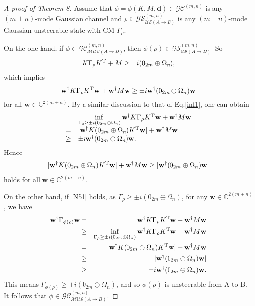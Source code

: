 \documentclass[10pt,aps,pra,amsfonts,amssymb,amsmath,%
floatfix,nofootinbib, groupedaddress,superscriptaddress,citesort,twocolumn
]{revtex4}%
\begin{document}
	\begin{proof}[A proof of Theorem 8]
		Assume that  $\phi =\phi\left( {K,M,\mathbf d} \right) \in {\mathcal {GC}}^{\left(m,n \right)}$ is any $(m+n)$-mode Gaussian channel and $\rho\in {\mathcal {GS}}^{(m,n)}_{\mathcal {US}(A \rightarrow B)}$ is any $(m+n)$-mode Gaussian unsteerable state with CM $\Gamma_{\rho}$.
		
		On the one hand, if  $\phi \in  {\mathcal {GC}}^{(m,n)}_{\mathcal {MUS}(A \rightarrow B)}$, 
		then 
		$\phi(\rho)\in {\mathcal {GS}}^{(m,n)}_{\mathcal {US}(A \rightarrow B)}$. So
		\begin{eqnarray*}
			K\Gamma_{\rho}K^{\rm T}+M  \ge \pm i( 0_{2m} \oplus \Omega _n ),
		\end{eqnarray*}
		which implies  
		\begin{eqnarray*}\label{N53}
			\mathbf{w}^{\dag}K\Gamma_{\rho}K^{\rm T}\mathbf{w}+\mathbf{w}^{\dag}M\mathbf{w}  \ge \pm i \mathbf{w}^{\dag} (0_{2m} \oplus \Omega _n)\mathbf{w}
		\end{eqnarray*}
		for all	$\mathbf{w} \in \mathbb{C}^{2(m+n)}$.
		By a similar discussion to that of Eq.\eqref{inf1},  one can obtain
		$$\begin{array}{rl}
			&\inf\limits_{\Gamma_{\rho} \ge  \pm i( 0_{2m} \oplus \Omega _n)}	\mathbf{w}^{\dag}K\Gamma_{\rho}K^{\rm T}\mathbf{w}+\mathbf{w}^{\dag}M\mathbf{w}  \\
			=& |{\bf w}^\dag K(0_{2m} \oplus \Omega _n)K^{\rm T}{\bf w}|+\mathbf{w}^{\dag}M\mathbf{w}  \\
			\ge &\pm i\mathbf{w}^{\dag} (0_{2m} \oplus \Omega _n)\mathbf{w}.
		\end{array}$$
		Hence
		\begin{eqnarray*}
			|\mathbf{w}^{\dag}K(0_{2m} \oplus \Omega _n)K^{\rm T}\mathbf{w}|+\mathbf{w}^{\dag}M\mathbf{w} \ge |\mathbf{w}^{\dag} (0_{2m} \oplus \Omega _n)\mathbf{w}|
		\end{eqnarray*}
		holds for all 	 $\mathbf{w} \in \mathbb{C}^{2(m+n)}$.
		
		On the other hand,  if \eqref{N51} holds, as $\Gamma_{\rho} \ge  \pm i\left( { 0_{2m} \oplus {\Omega _n}} \right) $,    for any $ \mathbf{w} \in \mathbb{C}^{2(m+n)}$, 
		we have
		\begin{eqnarray*}
			\mathbf{w}^{\dag}\Gamma _{\phi ( \rho )}\mathbf{w}
			&=&\mathbf{w}^{\dag}K\Gamma_{\rho} {K^{\rm T}}\mathbf{w} +\mathbf{w}^{\dag} M \mathbf{w}\\
			&\ge& \inf_{\Gamma_{\rho} \ge \pm i( 0_{2m} \oplus \Omega _n )} \mathbf{w}^{\dag}K\Gamma_{\rho} {K^{\rm T}}\mathbf{w} +\mathbf{w}^{\dag} M \mathbf{w}\\
			&=& |\mathbf{w}^{\dag}K(0_{2m} \oplus \Omega _n)K^{\rm T}\mathbf{w}|+\mathbf{w}^{\dag}M\mathbf{w}  \\
			&\ge& |\mathbf{w}^{\dag} (0_{2m} \oplus \Omega _n)\mathbf{w}|\\
			&\ge& \pm i\mathbf{w}^{\dag } (0_{2m} \oplus \Omega _n)\mathbf{w} .
		\end{eqnarray*}
		This means  $\Gamma _{\phi ( \rho )}\ge \pm i(0_{2m} \oplus \Omega _n)$, and so $\phi(\rho)$ is unsteerable from A to B.
		It  follows that  $\phi \in {\mathcal {GC}}^{(m,n)}_{\mathcal {MUS}(A \rightarrow B)}$.
	\end{proof}
	
\end{document}
